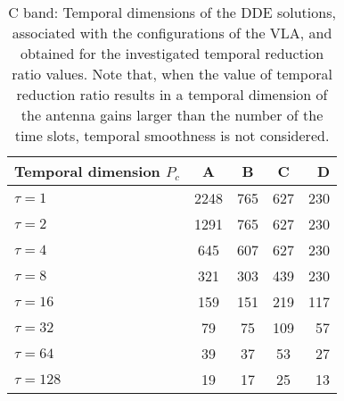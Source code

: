 \begin{table}
	\caption{C band: Temporal dimensions of the DDE solutions, associated with the configurations of the VLA, and obtained for the investigated temporal reduction ratio values. {{Note that, when the value of temporal reduction ratio results in a temporal dimension of the antenna gains larger than the number of the time slots, temporal smoothness is not considered. }} }	
\centering
	\begin{tabular}{lcccr} %
		\hline
		\textbf{Temporal dimension $P_c$} & A & B& C & D\\
		\hline
		 $\tau=1$ & 2248 & 765 & 627 & 230 \\ 
		$\tau=2$ & 1291 & 765 & 627 & 230\\
 $\tau=4$ & 645 & 607 & 627 & 230\\
 $\tau=8$ & 321 & 303 & 439 & 230\\
 $\tau=16$ & 159 & 151 & 219 & 117\\
 $\tau=32$ & 79 & 75 & 109 & 57\\
 $\tau=64$ & 39 & 37 & 53 & 27\\
  $\tau=128$ & 19 & 17 & 25 & 13\\

		\hline
	\end{tabular}	
	\label{tab:dde_temporal_dim}	
\end{table}